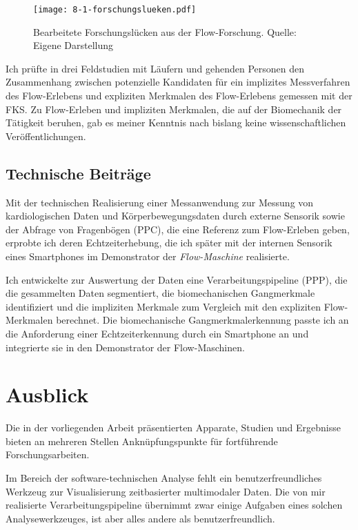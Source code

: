 \begin{figure}[t]
	\centering
		\texttt{[image: 8-1-forschungslueken.pdf]}
	\caption[Bearbeitete Forschungslücken aus der Flow-Forschung]{Bearbeitete Forschungslücken aus der Flow-Forschung. Quelle: Eigene Darstellung}
	\label{fig:8_1_forschungslueken}
\end{figure}

Ich prüfte in drei Feldstudien mit Läufern und gehenden Personen den Zusammenhang zwischen potenzielle Kandidaten für ein implizites Messverfahren des Flow-Erlebens und expliziten Merkmalen des Flow-Erlebens gemessen mit der \ac{FKS}. Zu Flow-Erleben und impliziten Merkmalen, die auf der Biomechanik der Tätigkeit beruhen, gab es meiner Kenntnis nach bislang keine wissenschaftlichen Veröffentlichungen. 

\subsection{Technische Beiträge}
Mit der technischen Realisierung einer Messanwendung zur Messung von kardiologischen Daten und Körperbewegungsdaten durch externe Sensorik sowie der Abfrage von Fragenbögen (\ac{PPC}), die eine Referenz zum Flow-Erleben geben, erprobte ich deren Echtzeiterhebung, die ich später mit der internen Sensorik eines Smartphones im Demonstrator der \emph{Flow-Maschine} realisierte. 

Ich entwickelte zur Auswertung der Daten eine Verarbeitungspipeline (\ac{PPP}), die die gesammelten Daten segmentiert, die biomechanischen Gangmerkmale identifiziert und die impliziten Merkmale zum Vergleich mit den expliziten Flow-Merkmalen berechnet. Die biomechanische Gangmerkmalerkennung passte ich an die Anforderung einer Echtzeiterkennung durch ein Smartphone an und integrierte sie in den Demonstrator der Flow-Maschinen. 

\section{Ausblick} 
\label{sec:ausblick} 
Die in der vorliegenden Arbeit präsentierten Apparate, Studien und Ergebnisse bieten an mehreren Stellen Anknüpfungspunkte für fortführende Forschungsarbeiten.

Im Bereich der software-technischen Analyse fehlt ein benutzerfreundliches Werkzeug zur Visualisierung zeitbasierter multimodaler Daten. Die von mir realisierte Verarbeitungspipeline übernimmt zwar einige Aufgaben eines solchen Analysewerkzeuges, ist aber alles andere als benutzerfreundlich. 

